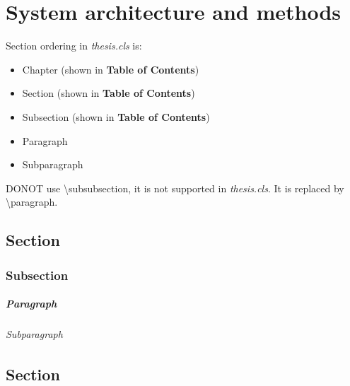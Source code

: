 \chapter{System architecture and methods}
\label{chapter:system}

Section ordering in \textit{thesis.cls} is:
\begin{itemize}
\item Chapter (shown in \textbf{Table of Contents})
\item Section (shown in \textbf{Table of Contents})
\item Subsection (shown in \textbf{Table of Contents})
\item Paragraph
\item Subparagraph
\end{itemize}
DONOT use \textbackslash subsubsection, it is not supported in \textit{thesis.cls}.
It is replaced by \textbackslash paragraph.

\section{Section}
\label{sec:secorder}
\lipsum[1-2]  %

\subsection{Subsection}
\label{subsec:secorder}
\lipsum[3-4]  %

\paragraph{Paragraph}
\lipsum[5-6]  %

\subparagraph{Subparagraph}
\lipsum[7]  %

\section{Section}
\label{sec:secorder}
\lipsum[8]  %
